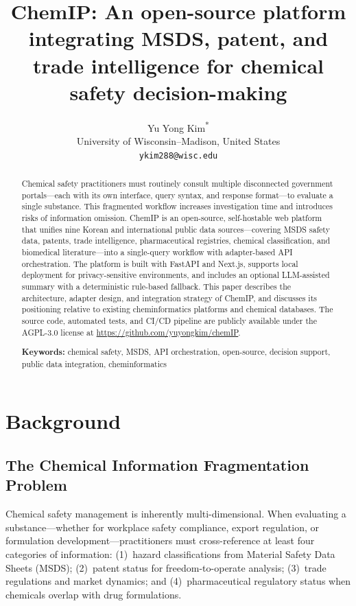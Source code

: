 \documentclass[10pt]{article}
\title{ChemIP: An open-source platform integrating MSDS, patent, and trade intelligence for chemical safety decision-making}
\author{Yu Yong Kim\textsuperscript{*} \\
  \small University of Wisconsin--Madison, United States \\
  \small \texttt{ykim288@wisc.edu}
}
\date{}
\begin{document}
\maketitle

\begin{abstract}
Chemical safety practitioners must routinely consult multiple disconnected government portals---each with its own interface, query syntax, and response format---to evaluate a single substance.
This fragmented workflow increases investigation time and introduces risks of information omission.
ChemIP is an open-source, self-hostable web platform that unifies nine Korean and international public data sources---covering MSDS safety data, patents, trade intelligence, pharmaceutical registries, chemical classification, and biomedical literature---into a single-query workflow with adapter-based API orchestration.
The platform is built with FastAPI and Next.js, supports local deployment for privacy-sensitive environments, and includes an optional LLM-assisted summary with a deterministic rule-based fallback.
This paper describes the architecture, adapter design, and integration strategy of ChemIP, and discusses its positioning relative to existing cheminformatics platforms and chemical databases.
The source code, automated tests, and CI/CD pipeline are publicly available under the AGPL-3.0 license at \url{https://github.com/yuyongkim/chemIP}.

\vspace{6pt}
\noindent\textbf{Keywords:} chemical safety, MSDS, API orchestration, open-source, decision support, public data integration, cheminformatics
\end{abstract}

\section{Background}
\label{sec:background}

\subsection{The Chemical Information Fragmentation Problem}

Chemical safety management is inherently multi-dimensional.
When evaluating a substance---whether for workplace safety compliance, export regulation, or formulation development---practitioners must cross-reference at least four categories of information: (1)~hazard classifications from Material Safety Data Sheets (MSDS); (2)~patent status for freedom-to-operate analysis; (3)~trade regulations and market dynamics; and (4)~pharmaceutical regulatory status when chemicals overlap with drug formulations.
\end{document}

